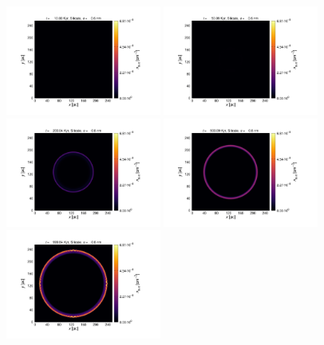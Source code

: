 \documentclass[fleqn,usenatbib]{mnras}
\begin{document}
\begin{figure}
 \includegraphics[trim=2.8cm 1.5cm 9.3cm 2.0cm, clip=true,page=1,height = 3.6cm]{Pics/Pics_A2/Density_1_00041.pdf}\hspace*{-0.05cm}
 \includegraphics[trim=5.2cm 1.5cm 9.3cm 2.0cm, clip=true,page=1,height = 3.6cm]{Pics/Pics_A2/Density_1_00201.pdf}\hspace*{-0.05cm}
 \includegraphics[trim=5.2cm 1.5cm 9.3cm 2.0cm, clip=true,page=1,height = 3.6cm]{Pics/Pics_A2/Density_1_00801.pdf}\hspace*{-0.05cm}
 \includegraphics[trim=5.2cm 1.5cm 9.3cm 2.0cm, clip=true,page=1,height = 3.6cm]{Pics/Pics_A2/Density_1_02001.pdf}\hspace*{-0.05cm} 
 \includegraphics[trim=5.2cm 1.5cm 3.2cm 2.0cm, clip=true,page=1,height = 3.6cm]{Pics/Pics_A2/Density_1_04000.pdf}\\

\end{figure}
\end{document}
